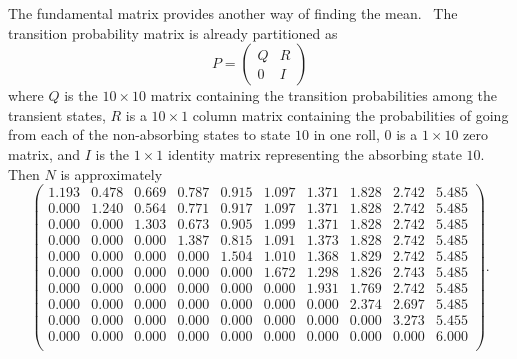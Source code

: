 \documentclass[12pt]{article}
\begin{document}
The fundamental matrix provides another way of finding the mean.~%
The transition probability matrix is already partitioned as
\[
    P =
    \begin{pmatrix}
        Q & R \\
        0 & I
    \end{pmatrix}
\] where \( Q \) is the \( 10 \times 10 \) matrix containing the
transition probabilities among the transient states, \( R \) is a \( 10
\times 1 \) column matrix containing the probabilities of going from
each of the non-absorbing states to state \( 10 \) in one roll, \( 0 \)
is a \( 1 \times 10 \) zero matrix, and \( I \) is the \( 1 \times 1 \)
identity matrix representing the absorbing state \( 10 \).  Then \( N \)
is approximately
\[
    \begin{pmatrix}
        1.193 & 0.478 & 0.669 & 0.787 & 0.915 & 1.097 & 1.371 & 1.828 &
        2.742 & 5.485 \\
        0.000 & 1.240 & 0.564 & 0.771 & 0.917 & 1.097 & 1.371 & 1.828 &
        2.742 & 5.485 \\
        0.000 & 0.000 & 1.303 & 0.673 & 0.905 & 1.099 & 1.371 & 1.828 &
        2.742 & 5.485 \\
        0.000 & 0.000 & 0.000 & 1.387 & 0.815 & 1.091 & 1.373 & 1.828 &
        2.742 & 5.485 \\
        0.000 & 0.000 & 0.000 & 0.000 & 1.504 & 1.010 & 1.368 & 1.829 &
        2.742 & 5.485 \\
        0.000 & 0.000 & 0.000 & 0.000 & 0.000 & 1.672 & 1.298 & 1.826 &
        2.743 & 5.485 \\
        0.000 & 0.000 & 0.000 & 0.000 & 0.000 & 0.000 & 1.931 & 1.769 &
        2.742 & 5.485 \\
        0.000 & 0.000 & 0.000 & 0.000 & 0.000 & 0.000 & 0.000 & 2.374 &
        2.697 & 5.485 \\
        0.000 & 0.000 & 0.000 & 0.000 & 0.000 & 0.000 & 0.000 & 0.000 &
        3.273 & 5.455 \\
        0.000 & 0.000 & 0.000 & 0.000 & 0.000 & 0.000 & 0.000 & 0.000 &
        0.000 & 6.000 \\
    \end{pmatrix}
    .
\]
\end{document}
